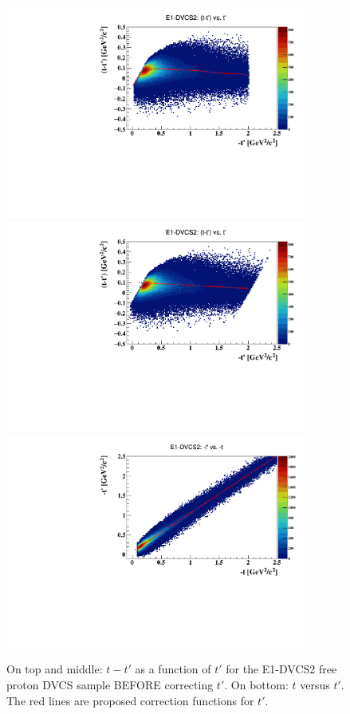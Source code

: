 \documentclass[a4paper,11pt,twoside]{article}
\begin{document}
\begin{figure}[h!]
\centering
\includegraphics[height=7.0cm]{fig/h_tprimet_t_InCoh_1.pdf}
\includegraphics[height=7.0cm]{fig/h_tprimet_t_InCoh_2.pdf}
\includegraphics[height=7.0cm]{fig/h_tprimet_t_InCoh_3.pdf}
\caption{On top and middle: $t-t'$ as a function of $t'$ for the E1-DVCS2 free 
proton DVCS sample BEFORE correcting $t'$. On bottom: $t$ versus $t'$.  The red 
lines are proposed correction functions for $t'$.}
\label{fig:corrections_tprime_e1dvcs2}
\end{figure}
\end{document}
